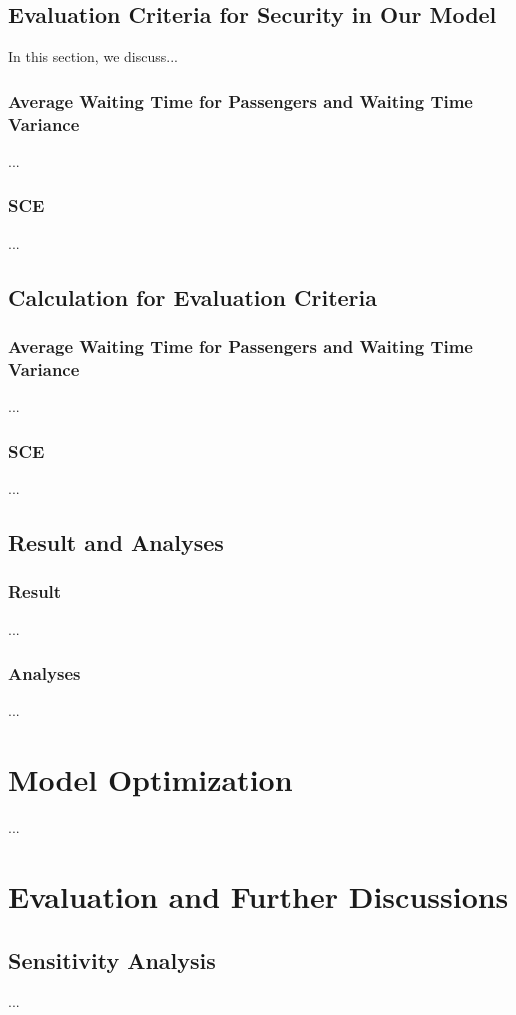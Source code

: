\documentclass{mcmthesis}
\begin{document}
\subsection{Evaluation Criteria for Security in Our Model}
In this section, we discuss...

\subsubsection{Average Waiting Time for Passengers and Waiting Time Variance}
	...
\subsubsection{SCE}
	...
\subsection{Calculation for Evaluation Criteria}

\subsubsection{Average Waiting Time for Passengers and Waiting Time Variance}
	...
\subsubsection{SCE}	
	...
\subsection{Result and Analyses}
\subsubsection{Result}
	...
\subsubsection{Analyses}
	...
\section{Model Optimization}
	...
\section{Evaluation and Further Discussions}
\subsection{Sensitivity Analysis}
	...
	
\end{document}

